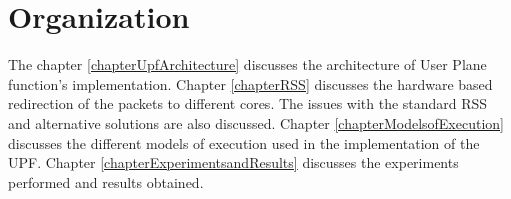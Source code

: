 \section {Organization \label{secOrganization}}
The chapter \ref{chapterUpfArchitecture} discusses the architecture of User Plane
 function's implementation. Chapter \ref{chapterRSS} discusses the  hardware based
  redirection of the packets to different cores. The issues with the standard RSS
 and alternative solutions are also discussed. Chapter \ref{chapterModelsofExecution} discusses the different models of execution used in the implementation of the UPF. Chapter \ref{chapterExperimentsandResults} discusses the experiments performed and results obtained.

